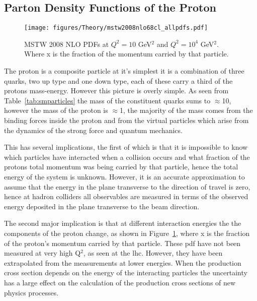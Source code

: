 \subsection{Parton Density Functions of the Proton} %
\label{sub:parton_density_functions_of_the_proton}

\begin{figure}[htbp]
  \centering
    \texttt{[image: figures/Theory/mstw2008nlo68cl\_allpdfs.pdf]}
  \caption{MSTW 2008 NLO PDFs at $Q^{2} = 10$ GeV$^{2}$ and $Q^{2} = 10^{4}$ GeV$^{2}$\cite{MSTW}. Where x is the fraction of the momentum carried by that particle.}
  \label{fig:mstwpdfs}
\end{figure}

The proton is a composite particle at it's simplest it is a combination of 
three quarks, two up type and one down type, each of these carry a third of the 
protons mass-energy. However this picture is overly simple. As seen from 
Table~\ref{tab:smparticles} the mass of the constituent quarks sums to 
$\approx$\unit{10}{\MeV}, however the mass of the proton is 
$\approx$\unit{1}{\GeV}, the majority of the mass comes from the binding forces 
inside the proton and from the virtual particles which arise from the dynamics 
of the strong force and quantum mechanics.

This has several implications, the first of which is that it is impossible to 
know which particles have interacted when a collision occurs and what fraction 
of the protons total momentum was being carried by that particle, hence the 
total energy of the system is unknown. However, it is an accurate approximation 
to assume that the energy in the plane transverse to the direction of travel is 
zero, hence at hadron colliders all observables are measured in terms of the 
observed energy deposited in the plane transverse to the beam direction.


The second major implication is that at different interaction energies the the 
components of the proton change, as shown in Figure~\ref{fig:mstwpdfs}, where x 
is the fraction of the proton's momentum carried by that particle. These 
\ac{pdf} have not been measured at very high Q$^{2}$, as seen at the 
\ac{lhc}. However, they have been extrapolated from the measurements at lower 
energies. When the production cross section depends on the energy of the 
interacting particles the uncertainty has a large effect on the calculation of 
the production cross sections of new physics processes.






